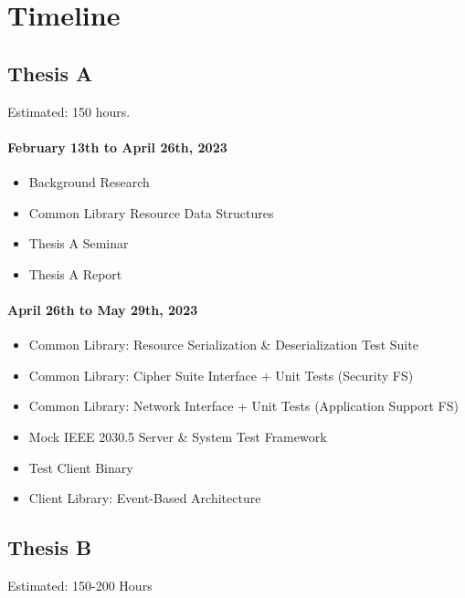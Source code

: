 \chapter{Timeline}\label{ch:timeline}
\section{Thesis A}
Estimated: 150 hours.

\subsubsection{February 13th to April 26th, 2023}
\begin{itemize}
    \item Background Research
    \item Common Library Resource Data Structures
    \item Thesis A Seminar
    \item Thesis A Report
\end{itemize}

\subsubsection{April 26th to May 29th, 2023}
\begin{itemize}
    \item Common Library: Resource Serialization \& Deserialization Test Suite
    \item Common Library: Cipher Suite Interface + Unit Tests (Security FS)
    \item Common Library: Network Interface + Unit Tests (Application Support FS)
    \item Mock IEEE 2030.5 Server \& System Test Framework
    \item Test Client Binary
    \item Client Library: Event-Based Architecture
\end{itemize}


\section{Thesis B}
Estimated: 150-200 Hours

